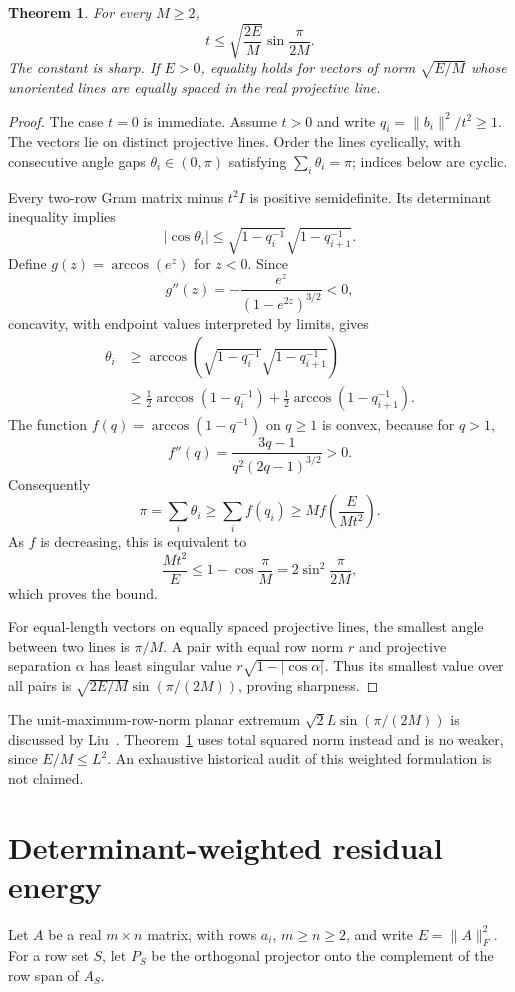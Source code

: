 \documentclass[11pt]{article}
\newtheorem{theorem}{Theorem}\newtheorem{lemma}[theorem]{Lemma}
\begin{document}
\begin{theorem}\label{thm:plane}
For every $M\ge2$,
\[
 t\le\sqrt{\frac{2E}{M}}\sin\frac{\pi}{2M}.
\]
The constant is sharp. If $E>0$, equality holds for vectors of norm $\sqrt{E/M}$ whose unoriented lines are equally spaced in the real projective line.
\end{theorem}
\begin{proof}
The case $t=0$ is immediate. Assume $t>0$ and write $q_i=\|b_i\|^2/t^2\ge1$. The vectors lie on distinct projective lines. Order the lines cyclically, with consecutive angle gaps $\theta_i\in(0,\pi)$ satisfying $\sum_i\theta_i=\pi$; indices below are cyclic.

Every two-row Gram matrix minus $t^2 I$ is positive semidefinite. Its determinant inequality implies
\[
 |\cos\theta_i|\le\sqrt{1-q_i^{-1}}\sqrt{1-q_{i+1}^{-1}}.
\]
Define $g(z)=\arccos(e^z)$ for $z<0$. Since
\[
 g''(z)=-\frac{e^z}{(1-e^{2z})^{3/2}}<0,
\]
concavity, with endpoint values interpreted by limits, gives
\begin{align*}
 \theta_i
 &\ge\arccos\left(\sqrt{1-q_i^{-1}}\sqrt{1-q_{i+1}^{-1}}\right)\\
 &\ge\frac12\arccos(1-q_i^{-1})+
       \frac12\arccos(1-q_{i+1}^{-1}).
\end{align*}
The function $f(q)=\arccos(1-q^{-1})$ on $q\ge1$ is convex, because for $q>1$,
\[
 f''(q)=\frac{3q-1}{q^2(2q-1)^{3/2}}>0.
\]
Consequently
\[
 \pi=\sum_i\theta_i\ge\sum_i f(q_i)
 \ge M f\left(\frac{E}{Mt^2}\right).
\]
As $f$ is decreasing, this is equivalent to
\[
 \frac{Mt^2}{E}\le1-\cos\frac\pi M
 =2\sin^2\frac\pi{2M},
\]
which proves the bound.

For equal-length vectors on equally spaced projective lines, the smallest angle between two lines is $\pi/M$. A pair with equal row norm $r$ and projective separation $\alpha$ has least singular value $r\sqrt{1-|\cos\alpha|}$. Thus its smallest value over all pairs is $\sqrt{2E/M}\sin(\pi/(2M))$, proving sharpness.
\end{proof}

The unit-maximum-row-norm planar extremum $\sqrt2 L\sin(\pi/(2M))$ is discussed by Liu~\cite{Liu}. Theorem~\ref{thm:plane} uses total squared norm instead and is no weaker, since $E/M\le L^2$. An exhaustive historical audit of this weighted formulation is not claimed.

\section{Determinant-weighted residual energy}
Let $A$ be a real $m\times n$ matrix, with rows $a_i$, $m\ge n\ge2$, and write $E=\|A\|_F^2$. For a row set $S$, let $P_S$ be the orthogonal projector onto the complement of the row span of $A_S$.
\end{document}
